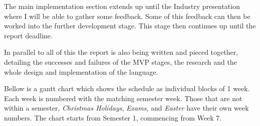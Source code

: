 \documentclass[12pt]{article}
\begin{document}
The main implementation section extends up until the Industry presentation where I will be able to gather some feedback.
Some of this feedback can then be worked into the further development stage. This stage then continues up until the report deadline.

In parallel to all of this the report is also being written and pieced together, detailing the successes and failures of the MVP stages, the research and the whole design and implementation of the language.

Bellow is a gantt chart which shows the schedule as individual blocks of 1 week. Each week is numbered with the matching semester week. Those that are not within a semester, \emph{Christmas Holidays}, \emph{Exams}, and  \emph{Easter} have their own week numbers. The chart starts from Semester 1, commencing from Week 7.
\end{document}
